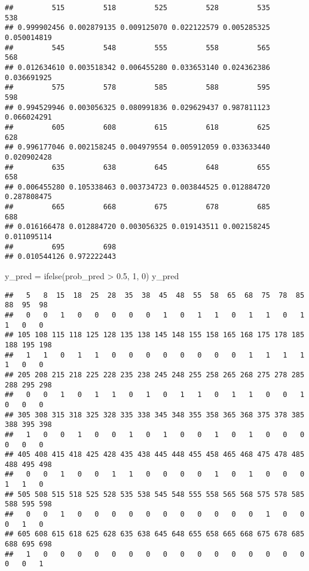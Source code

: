 \documentclass[
]{article}
\newenvironment{Shaded}{\begin{snugshade}}{\end{snugshade}}
\newcommand{\DecValTok}[1]{\textcolor[rgb]{0.00,0.00,0.81}{#1}}
\newcommand{\FloatTok}[1]{\textcolor[rgb]{0.00,0.00,0.81}{#1}}
\newcommand{\FunctionTok}[1]{\textcolor[rgb]{0.00,0.00,0.00}{#1}}
\newcommand{\NormalTok}[1]{#1}
\newcommand{\OtherTok}[1]{\textcolor[rgb]{0.56,0.35,0.01}{#1}}
\newcommand{\SpecialCharTok}[1]{\textcolor[rgb]{0.00,0.00,0.00}{#1}}
\begin{document}
\begin{verbatim}
##         515         518         525         528         535         538 
## 0.999902456 0.002879135 0.009125070 0.022122579 0.005285325 0.050014819 
##         545         548         555         558         565         568 
## 0.012634610 0.003518342 0.006455280 0.033653140 0.024362386 0.036691925 
##         575         578         585         588         595         598 
## 0.994529946 0.003056325 0.080991836 0.029629437 0.987811123 0.066024291 
##         605         608         615         618         625         628 
## 0.996177046 0.002158245 0.004979554 0.005912059 0.033633440 0.020902428 
##         635         638         645         648         655         658 
## 0.006455280 0.105338463 0.003734723 0.003844525 0.012884720 0.287808475 
##         665         668         675         678         685         688 
## 0.016166478 0.012884720 0.003056325 0.019143511 0.002158245 0.011095114 
##         695         698 
## 0.010544126 0.972222443
\end{verbatim}

\begin{Shaded}
\begin{Highlighting}[]
\NormalTok{y\_pred }\OtherTok{=} \FunctionTok{ifelse}\NormalTok{(prob\_pred }\SpecialCharTok{\textgreater{}} \FloatTok{0.5}\NormalTok{, }\DecValTok{1}\NormalTok{, }\DecValTok{0}\NormalTok{)}
\NormalTok{y\_pred}
\end{Highlighting}
\end{Shaded}

\begin{verbatim}
##   5   8  15  18  25  28  35  38  45  48  55  58  65  68  75  78  85  88  95  98 
##   0   0   1   0   0   0   0   0   1   0   1   1   0   1   1   0   1   1   0   0 
## 105 108 115 118 125 128 135 138 145 148 155 158 165 168 175 178 185 188 195 198 
##   1   1   0   1   1   0   0   0   0   0   0   0   0   1   1   1   1   1   0   0 
## 205 208 215 218 225 228 235 238 245 248 255 258 265 268 275 278 285 288 295 298 
##   0   0   1   0   1   1   0   1   0   1   1   0   1   1   0   0   1   0   0   0 
## 305 308 315 318 325 328 335 338 345 348 355 358 365 368 375 378 385 388 395 398 
##   1   0   0   1   0   0   1   0   1   0   0   1   0   1   0   0   0   0   0   0 
## 405 408 415 418 425 428 435 438 445 448 455 458 465 468 475 478 485 488 495 498 
##   0   0   1   0   0   1   1   0   0   0   0   1   0   1   0   0   0   1   1   0 
## 505 508 515 518 525 528 535 538 545 548 555 558 565 568 575 578 585 588 595 598 
##   0   0   1   0   0   0   0   0   0   0   0   0   0   0   1   0   0   0   1   0 
## 605 608 615 618 625 628 635 638 645 648 655 658 665 668 675 678 685 688 695 698 
##   1   0   0   0   0   0   0   0   0   0   0   0   0   0   0   0   0   0   0   1
\end{verbatim}
\end{document}
